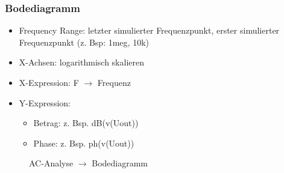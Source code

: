 \subsubsection*{Bodediagramm}

\begin{itemize}
    \item Frequency Range: letzter simulierter Frequenzpunkt, erster simulierter Frequenzpunkt (z. Bsp: 1meg, 10k)
    \item X-Achsen: logarithmisch skalieren
    \item X-Expression: F $\rightarrow$ Frequenz
    \item Y-Expression: \begin{itemize}
        \item Betrag: z. Bsp. dB(v(Uout))
        \item Phase: z. Bsp. ph(v(Uout))
    \end{itemize}
\end{itemize}

\begin{figure}[h]
    \centering
    \caption{AC-Analyse $\rightarrow$ Bodediagramm}
    \label{fig:Bodediagramm}
\end{figure}


